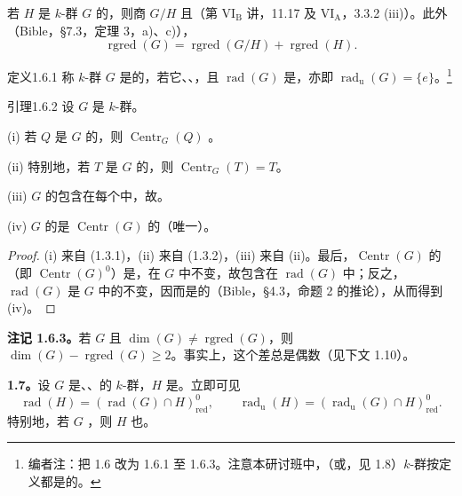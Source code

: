 若 $H$ 是 $k$-群 $G$ 的，则商 $G/H$ 且（第 VI$_{\mathrm B}$ 讲，11.17 及 VI$_{\mathrm A}$，3.3.2 (iii)）。此外（Bible，\S 7.3，定理 3，a)、c)），
\[
\operatorname{rgred}(G)=\operatorname{rgred}(G/H)+\operatorname{rgred}(H).
\]
\begin{SGAresult}{定义}{1.6.1}
称 $k$-群 $G$ 是的，若它、、，且 $\operatorname{rad}(G)$ 是，亦即 $\operatorname{rad}_{\mathrm u}(G)=\{e\}$。\footnote[7]{编者注：把 1.6 改为 1.6.1 至 1.6.3。注意本研讨班中，（或，见 1.8）$k$-群按定义都是的。}
\end{SGAresult}
\begin{SGAresult}{引理}{1.6.2}
设 $G$ 是 $k$-群。

(i) 若 $Q$ 是 $G$ 的，则 $\operatorname{Centr}_G(Q)$ 。

(ii) 特别地，若 $T$ 是 $G$ 的，则 $\operatorname{Centr}_G(T)=T$。

(iii) $G$ 的包含在每个中，故。

(iv) $G$ 的是 $\operatorname{Centr}(G)$ 的（唯一）。
\end{SGAresult}
\begin{proof}
(i) 来自 (1.3.1)，(ii) 来自 (1.3.2)，(iii) 来自 (ii)。最后，$\operatorname{Centr}(G)$ 的（即 $\operatorname{Centr}(G)^0$）是，在 $G$ 中不变，故包含在 $\operatorname{rad}(G)$ 中；反之，$\operatorname{rad}(G)$ 是 $G$ 中的不变，因而是的（Bible，\S 4.3，命题 2 的推论），从而得到 (iv)。
\end{proof}
\textbf{注记 1.6.3。}若 $G$ 且 $\dim(G)\ne\operatorname{rgred}(G)$，则 $\dim(G)-\operatorname{rgred}(G)\ge2$。事实上，这个差总是偶数（见下文 1.10）。

\textbf{1.7。}设 $G$ 是、、的 $k$-群，$H$ 是。立即可见
\begin{equation}
\operatorname{rad}(H)=(\operatorname{rad}(G)\cap H)^0_{\mathrm{red}},\qquad
\operatorname{rad}_{\mathrm u}(H)=(\operatorname{rad}_{\mathrm u}(G)\cap H)^0_{\mathrm{red}}.\tag{1.7.1}
\end{equation}
特别地，若 $G$ ，则 $H$ 也。

